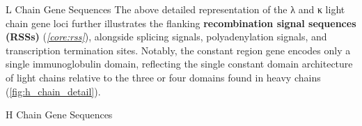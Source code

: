 \begin{core}[label=core:l_chain_gene]{L Chain Gene Sequences}
      The above detailed representation of the λ and κ light chain gene loci further illustrates the flanking \textbf{recombination signal sequences (RSSs)} (\textit{\autoref{core:rss}}), alongside splicing signals, polyadenylation signals, and transcription termination sites. Notably, the constant region gene encodes only a single immunoglobulin domain, reflecting the single constant domain architecture of light chains relative to the three or four domains found in heavy chains (\autoref{fig:h_chain_detail}).

    \end{core} 

    \begin{core}[label=core:h_chain_gene]{H Chain Gene Sequences}

\end{core}
